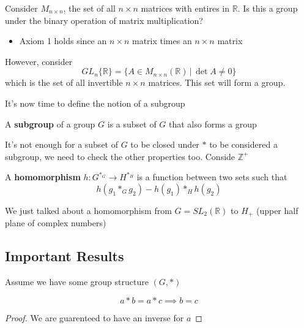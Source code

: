 \documentclass{report}
\begin{document}
\begin{example}
    Consider $M_{n \times n}$, the set of all $n \times n$ matrices with entires in $\mathbb{R}$. Is this a group under the binary operation of matrix multiplication?
    \begin{itemize}
        \item Axiom 1 holds since an $n \times n$ matrix times an $n \times n$ matrix
    \end{itemize}

    However, consider
    \begin{equation*}
        GL_n\{\mathbb{R}\} = \{A \in M_{n \times n}(\mathbb{R}) \,|\, \det A \neq 0\}
    \end{equation*}
    which is the set of all invertible $n \times n$ matrices. This set will form a group.
\end{example}

It's now time to define the notion of a subgroup

\begin{definition}
    A \textbf{subgroup} of a group $G$ is a subset of $G$ that also forms a group
\end{definition}

\begin{remark}
    It's not enough for a subset of $G$ to be closed under $*$ to be considered a subgroup, we need to check the other properties too. Conside $\mathbb{Z}^+$
\end{remark}


\begin{definition}
    A \textbf{homomorphism} $h: G^{*_G} \rightarrow H^{*_H}$ is a function between two sets such that
    \begin{equation*}
        h(g_1 *_G g_2) - h(g_1) *_H h(g_2)
    \end{equation*}
\end{definition}

\begin{example}
    We just talked about a homomorphism from $G = SL_2 (\mathbb{R})$ to $H_+$ (upper half plane of complex numbers)
\end{example}

\subsection{Important Results}
Assume we have some group structure $(G, *)$
\begin{theorem}
    \begin{equation*}
        a * b = a * c \implies b = c
    \end{equation*}
\end{theorem}
\begin{proof}
    We are guarenteed to have an inverse for $a$
\end{proof}
\end{document}
